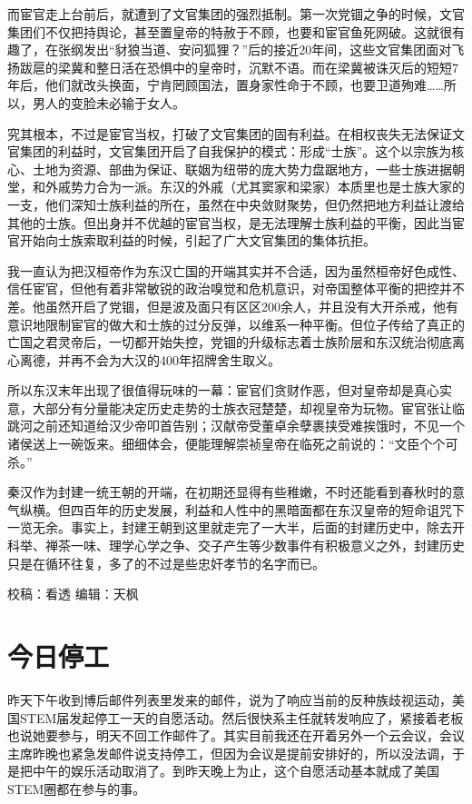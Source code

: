 \documentclass[]{book}
\begin{document}
而宦官走上台前后，就遭到了文官集团的强烈抵制。第一次党锢之争的时候，文官集团们不仅把持舆论，甚至置皇帝的特赦于不顾，也要和宦官鱼死网破。这就很有趣了，在张纲发出``豺狼当道、安问狐狸？''后的接近20年间，这些文官集团面对飞扬跋扈的梁冀和整日活在恐惧中的皇帝时，沉默不语。而在梁冀被诛灭后的短短7年后，他们就改头换面，宁肯罔顾国法，置身家性命于不顾，也要卫道殉难\ldots{}\ldots{}所以，男人的变脸未必输于女人。

究其根本，不过是宦官当权，打破了文官集团的固有利益。在相权丧失无法保证文官集团的利益时，文官集团开启了自我保护的模式：形成``士族''。这个以宗族为核心、土地为资源、部曲为保证、联姻为纽带的庞大势力盘踞地方，一些士族进据朝堂，和外戚势力合为一派。东汉的外戚（尤其窦家和梁家）本质里也是士族大家的一支，他们深知士族利益的所在，虽然在中央敛财聚势，但仍然把地方利益让渡给其他的士族。但出身并不优越的宦官当权，是无法理解士族利益的平衡，因此当宦官开始向士族索取利益的时候，引起了广大文官集团的集体抗拒。

我一直认为把汉桓帝作为东汉亡国的开端其实并不合适，因为虽然桓帝好色成性、信任宦官，但他有着非常敏锐的政治嗅觉和危机意识，对帝国整体平衡的把控并不差。他虽然开启了党锢，但是波及面只有区区200余人，并且没有大开杀戒，他有意识地限制宦官的做大和士族的过分反弹，以维系一种平衡。但位子传给了真正的亡国之君灵帝后，一切都开始失控，党锢的升级标志着士族阶层和东汉统治彻底离心离德，并再不会为大汉的400年招牌舍生取义。

所以东汉末年出现了很值得玩味的一幕：宦官们贪财作恶，但对皇帝却是真心实意，大部分有分量能决定历史走势的士族衣冠楚楚，却视皇帝为玩物。宦官张让临跳河之前还知道给汉少帝叩首告别；汉献帝受董卓余孽裹挟受难挨饿时，不见一个诸侯送上一碗饭来。细细体会，便能理解崇祯皇帝在临死之前说的：``文臣个个可杀。''

秦汉作为封建一统王朝的开端，在初期还显得有些稚嫩，不时还能看到春秋时的意气纵横。但四百年的历史发展，利益和人性中的黑暗面都在东汉皇帝的短命诅咒下一览无余。事实上，封建王朝到这里就走完了一大半，后面的封建历史中，除去开科举、禅茶一味、理学心学之争、交子产生等少数事件有积极意义之外，封建历史只是在循环往复，多了的不过是些忠奸孝节的名字而已。

校稿：看透
编辑：天枫

\hypertarget{ux4ecaux65e5ux505cux5de5}{%
\section{今日停工}\label{ux4ecaux65e5ux505cux5de5}}

昨天下午收到博后邮件列表里发来的邮件，说为了响应当前的反种族歧视运动，美国STEM届发起停工一天的自愿活动。然后很快系主任就转发响应了，紧接着老板也说她要参与，明天不回工作邮件了。其实目前我还在开着另外一个云会议，会议主席昨晚也紧急发邮件说支持停工，但因为会议是提前安排好的，所以没法调，于是把中午的娱乐活动取消了。到昨天晚上为止，这个自愿活动基本就成了美国STEM圈都在参与的事。
\end{document}
